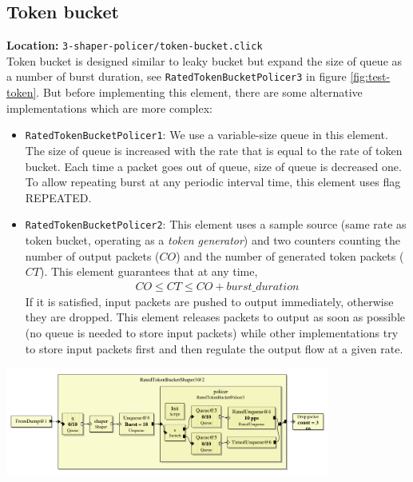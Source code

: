 \documentclass[a4paper]{article}
\begin{document}
  \subsection{Token bucket}
  \textbf{Location:} \texttt{3-shaper-policer/token-bucket.click} \\
  Token bucket is designed similar to leaky bucket but expand the size of queue as a number of burst duration, see \texttt{RatedTokenBucketPolicer3} in figure \ref{fig:test-token}. But before implementing this element, there are some alternative implementations which are more complex:
  \begin{itemize}
  	\item \texttt{RatedTokenBucketPolicer1}: We use a variable-size queue in this element. The size of queue is increased with the rate that is equal to the rate of token bucket. Each time a packet goes out of queue, size of queue is decreased one. To allow repeating burst at any periodic interval time, this element uses flag REPEATED.
  	\item \texttt{RatedTokenBucketPolicer2}: This element uses a sample source (same rate as token bucket, operating as a \textit{token generator}) and two counters counting the number of output packets ($CO$) and the number of generated token packets ($CT$). This element guarantees that at any time, \\ 
  	\begin{align*}CO \le CT \le CO + burst\_duration \end{align*}
  	If it is satisfied, input packets are pushed to output immediately, otherwise they are dropped. This element releases packets to output as soon as possible (no queue is needed to store input packets) while other implementations try to store input packets first and then regulate the output flow at a given rate.
  \end{itemize} 
  \begin{center}
	\includegraphics[width=0.8\textwidth]{token-shaper.pdf}
	\label{fig:test-token}
  \end{center}
  
\end{document}
